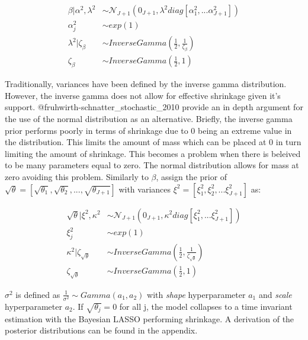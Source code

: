 \documentclass[
]{article}
\begin{document}
\begin{align}
\beta | \alpha^2, \lambda^2 &\sim \mathcal{N}_{J+1} (0_{J+1}, \lambda^2 diag[\alpha_1^2,...\alpha_{J+1}^2])\\
\alpha_j^2  &\sim exp\left(1\right)\\
\lambda^2 |\zeta_\beta &\sim InverseGamma\left(\frac{1}{2}, \frac{1}{\zeta_\beta}\right)\\
\zeta_{\beta} & \sim InverseGamma\left(\frac{1}{2},1\right)
\end{align}

Traditionally, variances have been defined by the inverse gamma
distribution. However, the inverse gamma does not allow for effective
shrinkage given it's support. @fruhwirth-schnatter\_stochastic\_2010
provide an in depth argument for the use of the normal distribution as
an alternative. Briefly, the inverse gamma prior performs poorly in
terms of shrinkage due to 0 being an extreme value in the distribution.
This limits the amount of mass which can be placed at 0 in turn limiting
the amount of shrinkage. This becomes a problem when there is beleived
to be many parameters equal to zero. The normal distribution allows for
mass at zero avoiding this problem. Similarly to \(\beta\), assign the
prior of
\(\sqrt{\theta}=\left[\sqrt{\theta_1},\sqrt{\theta_2},...,\sqrt{\theta_{J+1}}\right]\)
with variances \(\xi^2=\left[\xi_1^2,\xi_2^2,...\xi_{J+1}^2 \right]\)
as:

\begin{align}
\sqrt{\theta} | \xi^2, \kappa^2 &\sim \mathcal{N}_{J+1} (0_{J+1}, \kappa^2 diag[\xi_1^2,...\xi_{J+1}^2])\\
\xi_j^2  &\sim exp\left(1\right)\\
\kappa^2 |\zeta_{\sqrt{\theta}} &\sim InverseGamma\left(\frac{1}{2}, \frac{1}{\zeta_{\sqrt{\theta}}}\right)\\
\zeta_{{\sqrt{\theta}}} & \sim InverseGamma\left(\frac{1}{2},1\right)
\end{align}

\(\sigma^2\) is defined as \(\frac{1}{\sigma^2} \sim Gamma(a_1,a_2)\)
with \emph{shape} hyperparameter \(a_1\) and \emph{scale} hyperparameter
\(a_2\). If \(\sqrt{\theta_j}=0\) for all j, the model collapses to a
time invariant estimation with the Bayesian LASSO performing shrinkage.
A derivation of the posterior distributions can be found in the
appendix.
\end{document}
